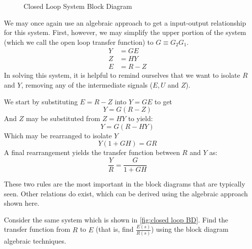 \begin{figure}[ht]

    
    \caption{Closed Loop System Block Diagram}
    \label{fig:closed loop BD}
\end{figure}
We may once again use an algebraic approach to get a input-output relationship for this system. First, however, we may simplify the upper portion of the system (which we call the open loop transfer function) to $G\equiv G_2G_1$.
\begin{align}
    Y&=GE\\
    Z&=HY\\
    E&=R-Z
\end{align}
In solving this system, it is helpful to remind ourselves that we want to isolate $R$ and $Y$, removing any of the intermediate signals ($E, U$ and $Z$).

We start by substituting $E=R-Z$ into $Y=GE$ to get
$$Y=G(R-Z)$$
And $Z$ may be substituted from $Z=HY$ to yield:
$$Y=G(R-HY)$$
Which may be rearranged to isolate $Y$
$$Y(1+GH)=GR$$
A final rearrangement yields the transfer function between $R$ and $Y$ as:
\begin{equation}\label{eq:feedback law}
    \frac{Y}{R}=\frac{G}{1+GH}
\end{equation}

These two rules are the most important in the block diagrams that are typically seen. Other relations do exist, which can be derived using the algebraic approach shown here.
\begin{exercise}\label{exer:error tf}
    Consider the same system which is shown in \autoref{fig:closed loop BD}. Find the transfer function from $R$ to $E$ (that is, find $\frac{E(s)}{R(s)}$) using the block diagram algebraic techniques.
\end{exercise}

